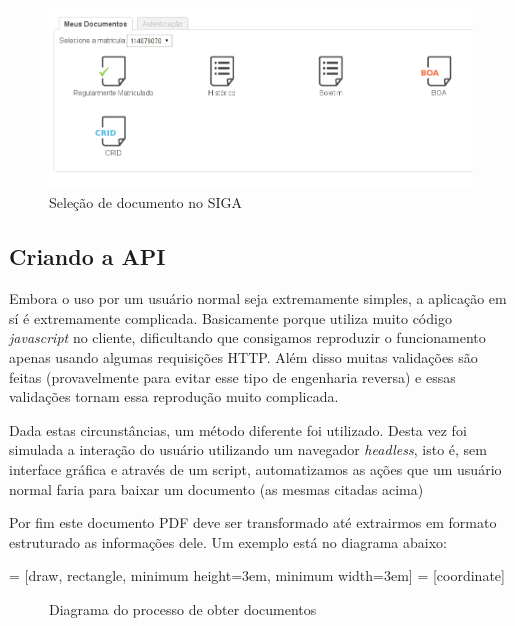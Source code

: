 \begin{figure}[!ht]
\centering
	\includegraphics[width=\textwidth]{siga_documentos.png}
  \caption{Seleção de documento no SIGA}
  \label{fig:siga_documentos}
\end{figure}

\subsection{Criando a API}

Embora o uso por um usuário normal seja extremamente simples, a aplicação em sí é extremamente complicada. Basicamente porque utiliza muito código \textit{javascript} no cliente, dificultando que consigamos reproduzir o funcionamento apenas usando algumas requisições HTTP. Além disso muitas validações são feitas (provavelmente para evitar esse tipo de engenharia reversa) e essas validações tornam essa reprodução muito complicada.

Dada estas circunstâncias, um método diferente foi utilizado. Desta vez foi simulada a interação do usuário utilizando um navegador \textit{headless}, isto é, sem interface gráfica e através de um script, automatizamos as ações que um usuário normal faria para baixar um documento (as mesmas citadas acima)

Por fim este documento PDF deve ser transformado até extrairmos em formato estruturado as informações dele. Um exemplo está no diagrama abaixo:

 = [draw, rectangle, minimum height=3em, minimum width=3em]
 = [coordinate]

\begin{figure}[H]
\caption{Diagrama do processo de obter documentos}
\end{figure}

